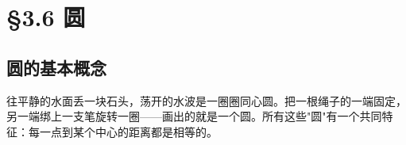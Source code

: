 \chapter{§3.6 圆}
\label{sec:3.6}





\section*{圆的基本概念}


\begin{explore}


往平静的水面丢一块石头，荡开的水波是一圈圈同心圆。把一根绳子的一端固定，另一端绑上一支笔旋转一圈——画出的就是一个圆。所有这些"圆"有一个共同特征：每一点到某个中心的距离都是相等的。

\end{explore}


